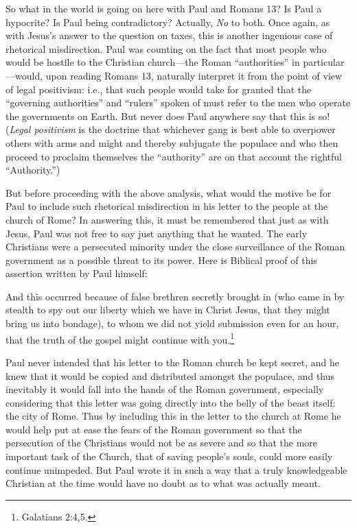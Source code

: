 \documentclass[letterpaper,12pt]{article}
\newenvironment{squote}
  {\small\quote}
  {\endquote\normalsize}
\begin{document}
So what in the world is going on here with Paul and Romans 13? Is Paul a hypocrite? Is Paul being contradictory? Actually, \emph{No} to both. Once again, as with Jesus's answer to the question on taxes, this is another ingenious case of rhetorical misdirection. Paul was counting on the fact that most people who would be hostile to the Christian church---the Roman ``authorities'' in particular---would, upon reading Romans 13, naturally interpret it from the point of view of legal positivism: i.e., that such people would take for granted that the ``governing authorities'' and ``rulers'' spoken of must refer to the men who operate the governments on Earth. But never does Paul anywhere say that this is so! (\emph{Legal positivism} is the doctrine that whichever gang is best able to overpower others with arms and might and thereby subjugate the populace and who then proceed to proclaim themselves the ``authority'' are on that account the rightful ``Authority.'')

But before proceeding with the above analysis, what would the motive be for Paul to include such rhetorical misdirection in his letter to the people at the church of Rome? In answering this, it must be remembered that just as with Jesus, Paul was not free to say just anything that he wanted. The early Christians were a persecuted minority under the close surveillance of the Roman government as a possible threat to its power. Here is Biblical proof of this assertion written by Paul himself:

\begin{squote}
And this occurred because of false brethren secretly brought in (who came in by stealth to spy out our liberty which we have in Christ Jesus, that they might bring us into bondage), to whom we did not yield submission even for an hour, that the truth of the gospel might continue with you.\footnote{Galatians 2:4,5.}
\end{squote}

Paul never intended that his letter to the Roman church be kept secret, and he knew that it would be copied and distributed amongst the populace, and thus inevitably it would fall into the hands of the Roman government, especially considering that this letter was going directly into the belly of the beast itself: the city of Rome. Thus by including this in the letter to the church at Rome he would help put at ease the fears of the Roman government so that the persecution of the Christians would not be as severe and so that the more important task of the Church, that of saving people's souls, could more easily continue unimpeded. But Paul wrote it in such a way that a truly knowledgeable Christian at the time would have no doubt as to what was actually meant.
\end{document}

